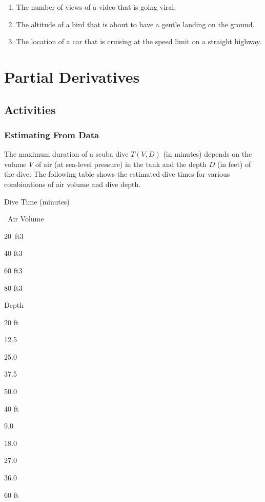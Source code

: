 \documentclass[
]{book}
\providecommand{\tightlist}{%
  \setlength{\itemsep}{0pt}\setlength{\parskip}{0pt}}
\begin{document}
\begin{enumerate}
\def\labelenumi{\arabic{enumi}.}
\tightlist
\item
  The number of views of a video that is going viral.
\item
  The altitude of a bird that is about to have a gentle landing on the ground.
\item
  The location of a car that is cruising at the speed limit on a straight highway.
\end{enumerate}

\hypertarget{partial-derivatives}{%
\chapter{Partial Derivatives}\label{partial-derivatives}}

\hypertarget{activities-12}{%
\section{Activities}\label{activities-12}}

\hypertarget{estimating-from-data}{%
\subsection{Estimating From Data}\label{estimating-from-data}}

The maximum duration of a scuba dive \(T(V,D)\) (in minutes) depends on the volume \(V\) of air (at sea-level pressure) in the tank and the depth \(D\) (in feet) of the dive.
The following table shows the estimated dive times for various combinations of air volume and dive depth.

Dive Time (minutes)~

~Air Volume

20~ft3

40 ft3

60 ft3

80 ft3

Depth

20 ft

12.5

25.0

37.5

50.0

40 ft

9.0

18.0

27.0

36.0

60 ft
\end{document}
